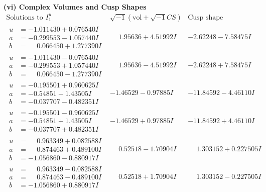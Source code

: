 \documentclass[1p]{elsarticle_modified}
\theoremstyle{definition}
\newcommand{\I}{\sqrt{-1}}
\begin{document}
\newpage\flushleft \textbf{(vi) Complex Volumes and Cusp Shapes}
$$\begin{array}{c|c|c}  
\text{Solutions to }I^u_{1}& \I (\text{vol} + \sqrt{-1}CS) & \text{Cusp shape}\\
 \hline 
\begin{aligned}
u &= -1.011430 + 0.076540 I \\
a &= -0.299553 - 1.057440 I \\
b &= \phantom{-}0.066450 + 1.277390 I\end{aligned}
 & \phantom{-}1.95636 + 4.51992 I & -2.62248 - 7.58475 I \\ \hline\begin{aligned}
u &= -1.011430 - 0.076540 I \\
a &= -0.299553 + 1.057440 I \\
b &= \phantom{-}0.066450 - 1.277390 I\end{aligned}
 & \phantom{-}1.95636 - 4.51992 I & -2.62248 + 7.58475 I \\ \hline\begin{aligned}
u &= -0.195501 + 0.960625 I \\
a &= -0.54851 - 1.43505 I \\
b &= -0.037707 - 0.482351 I\end{aligned}
 & -1.46529 - 0.97885 I & -11.84592 - 4.46110 I \\ \hline\begin{aligned}
u &= -0.195501 - 0.960625 I \\
a &= -0.54851 + 1.43505 I \\
b &= -0.037707 + 0.482351 I\end{aligned}
 & -1.46529 + 0.97885 I & -11.84592 + 4.46110 I \\ \hline\begin{aligned}
u &= \phantom{-}0.963349 + 0.082588 I \\
a &= \phantom{-}0.874463 + 0.489100 I \\
b &= -1.056860 - 0.880917 I\end{aligned}
 & \phantom{-}0.52518 - 1.70904 I & \phantom{-}1.303152 + 0.227505 I \\ \hline\begin{aligned}
u &= \phantom{-}0.963349 - 0.082588 I \\
a &= \phantom{-}0.874463 - 0.489100 I \\
b &= -1.056860 + 0.880917 I\end{aligned}
 & \phantom{-}0.52518 + 1.70904 I & \phantom{-}1.303152 - 0.227505 I \\ \hline\begin{aligned}

\end{aligned}
\end{array}$$
\end{document}
